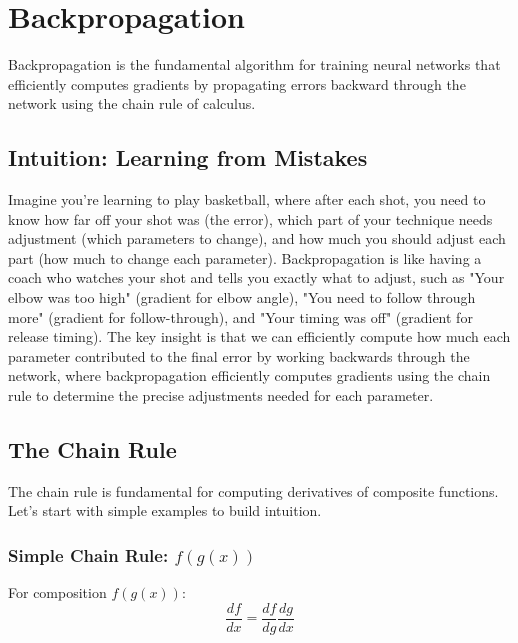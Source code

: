 
\section{Backpropagation }
\label{sec:backpropagation}

Backpropagation is the fundamental algorithm for training neural networks that efficiently computes gradients by propagating errors backward through the network using the chain rule of calculus.

\subsection{Intuition: Learning from Mistakes}

Imagine you're learning to play basketball, where after each shot, you need to know how far off your shot was (the error), which part of your technique needs adjustment (which parameters to change), and how much you should adjust each part (how much to change each parameter). Backpropagation is like having a coach who watches your shot and tells you exactly what to adjust, such as "Your elbow was too high" (gradient for elbow angle), "You need to follow through more" (gradient for follow-through), and "Your timing was off" (gradient for release timing). The key insight is that we can efficiently compute how much each parameter contributed to the final error by working backwards through the network, where backpropagation efficiently computes gradients using the chain rule to determine the precise adjustments needed for each parameter.

\subsection{The Chain Rule}

The chain rule is fundamental for computing derivatives of composite functions. Let's start with simple examples to build intuition.

\subsubsection{Simple Chain Rule: $f(g(x))$}

For composition $f(g(x))$:
\begin{equation}
\frac{df}{dx} = \frac{df}{dg} \frac{dg}{dx}
\end{equation}

